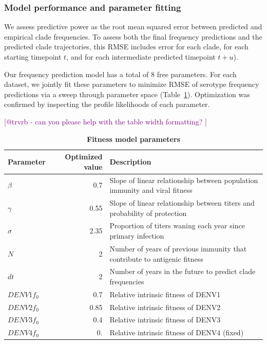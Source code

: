 \documentclass[11pt,oneside,letterpaper]{article}
\def\sbc#1{\textcolor{purple}{[#1]}}
\begin{document}
\subsubsection{Model performance and parameter fitting}
We assess predictive power as the root mean squared error between predicted and empirical clade frequencies.
To assess both the final frequency predictions and the predicted clade trajectories, this RMSE includes error for each clade, for each starting timepoint $t$, and for each intermediate predicted timepoint $t+u$).

Our frequency prediction model has a total of 8 free parameters.
For each dataset, we jointly fit these parameters to minimize RMSE of serotype frequency predictions via a sweep through parameter space (Table~\ref{fitness_model_parameters}).
Optimization was confirmed by inspecting the profile likelihoods of each parameter.

\sbc{@trvrb - can you please help with the table width formatting? }
\begin{table}[ht!]
  \begin{center}
    \label{fitness_model_parameters}
    \begin{tabular}{l|r|l}
      Parameter & Optimized value & Description\\
      \hline
      $\beta$ & 0.7 & Slope of linear relationship between population immunity and viral fitness\\
      $\gamma$ & 0.55 & Slope of linear relationship between titers and probability of protection\\
      $\sigma$ & 2.35 & Proportion of titers waning each year since primary infection\\
      $N$ & 2 & Number of years of previous immunity that contribute to antigenic fitness\\
      $dt$ & 2 & Number of years in the future to predict clade frequencies\\
      $DENV1 f_{0}$ & 0.7 & Relative intrinsic fitness of DENV1\\
      $DENV2 f_{0}$ & 0.85 & Relative intrinsic fitness of DENV2\\
      $DENV3 f_{0}$ & 0.4 & Relative intrinsic fitness of DENV3\\
      $DENV4 f_{0}$ & 0. & Relative intrinsic fitness of DENV4 (fixed)\\
    \end{tabular}
    \caption{
    \textbf{Fitness model parameters}
    }
  \end{center}
\end{table}
\end{document}

